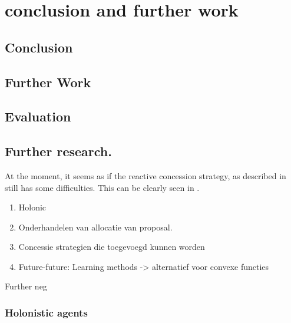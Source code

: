 \chapter{conclusion and further work}
\section{Conclusion}
\section{Further Work}
\section{Evaluation}


\section{Further research.}
At the moment, it seems as if the reactive concession strategy, as described in \citet{zheng2015automated} still has some difficulties. This can be clearly seen in . 


\begin{enumerate}
	\item Holonic

\item
Onderhandelen van allocatie van proposal.
\item
Concessie strategien die toegevoegd kunnen worden
\item
Future-future: Learning methods -> alternatief voor convexe functies

\end{enumerate}

Further neg
%




\subsection{Holonistic agents}

